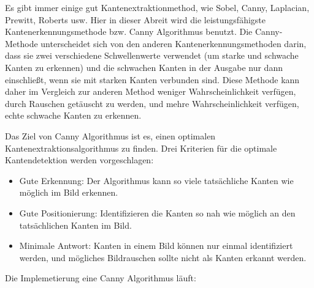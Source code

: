 Es gibt immer einige gut Kantenextraktionmethod, wie Sobel, Canny, Laplacian, Prewitt, Roberts usw. Hier in dieser Abreit wird die leistungsfähigste Kantenerkennungsmethode bzw. Canny Algorithmus benutzt. Die Canny-Methode unterscheidet sich von den anderen Kantenerkennungsmethoden darin, dass sie zwei verschiedene Schwellenwerte verwendet (um starke und schwache Kanten zu erkennen) und die schwachen Kanten in der Ausgabe nur dann einschließt, wenn sie mit starken Kanten verbunden sind. Diese Methode kann daher im Vergleich zur anderen Method weniger Wahrscheinlichkeit verfügen, durch Rauschen getäuscht zu werden, und mehre Wahrscheinlichkeit verfügen, echte schwache Kanten zu erkennen.

Das Ziel von Canny Algorithmus ist es, einen optimalen Kantenextraktionsalgorithmus zu finden. Drei Kriterien für die optimale Kantendetektion werden vorgeschlagen:

\begin{itemize}

\item Gute Erkennung: Der Algorithmus kann so viele tatsächliche Kanten wie möglich im Bild erkennen.
\item Gute Positionierung: Identifizieren die Kanten so nah wie möglich an den tatsächlichen Kanten im Bild.
\item Minimale Antwort: Kanten in einem Bild können nur einmal identifiziert werden, und mögliches Bildrauschen sollte nicht als Kanten erkannt werden.

\end{itemize}

Die Implemetierung eine Canny Algorithmus läuft:

